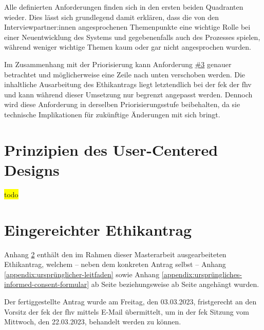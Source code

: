 \documentclass[a4paper,12pt,twoside]{scrreprt}
\begin{document}
Alle definierten Anforderungen finden sich in den ersten beiden Quadranten wieder. Dies lässt sich grundlegend damit erklären, dass die von den Interviewpartner:innen angesprochenen Themenpunkte eine wichtige Rolle bei einer Neuentwicklung des Systems und gegebenenfalls auch des Prozesses spielen, während weniger wichtige Themen kaum oder gar nicht angesprochen wurden.

\medskip

Im Zusammenhang mit der Priorisierung kann Anforderung \hyperref[sub-sub-sec:abgeleitete-anforderungen-während-erstellung-einreichung]{\#3} genauer betrachtet und möglicherweise eine Zeile nach unten verschoben werden. Die inhaltliche Ausarbeitung des Ethikantrags liegt letztendlich bei der \ac{fek} der \ac{fhv} und kann während dieser Umsetzung nur begrenzt angepasst werden. Dennoch wird diese Anforderung in derselben Priorisierungsstufe beibehalten, da sie technische Implikationen für zukünftige Änderungen mit sich bringt.

\chapter{Prinzipien des User-Centered Designs}
\label{chap:prinzipien-user-centered-design}

\colorbox{yellow}{todo}

\clearpage
{}
{}
\printbibliography

\appendix

\chapter{Eingereichter Ethikantrag}
\label{appendix:eingereichter-ethikantrag}

Anhang \ref{appendix:eingereichter-ethikantrag} enthält den im Rahmen dieser Masterarbeit ausgearbeiteten Ethikantrag, welchem -- neben dem konkreten Antrag selbst -- Anhang \ref{appendix:ursprünglicher-leitfaden} sowie Anhang \ref{appendix:ursprüngliches-informed-consent-formular} ab Seite \pageref{appendix:ursprünglicher-leitfaden} beziehungsweise ab Seite \pageref{appendix:ursprüngliches-informed-consent-formular} angehängt wurden.

Der fertiggestellte Antrag wurde am Freitag, den 03.03.2023, fristgerecht an den Vorsitz der \acl{fek} der \acl{fhv} mittels E-Mail übermittelt, um in der \ac{fek} Sitzung vom Mittwoch, den 22.03.2023, behandelt werden zu können.
\end{document}
